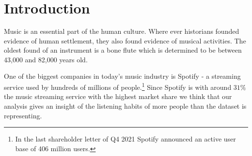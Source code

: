 \section{Introduction}
Music is an essential part of the human culture. Where ever historians founded evidence of human settlement, they also found evidence of musical activities. The oldest found of an instrument is a bone flute which is determined to be between 43,000 and 82,000 years old.\citep[p. 63]{Peretz2003} 

One of the biggest companies in today's music industry is Spotify - a streaming service used by hundreds of millions of people.\footnote{In the last shareholder letter of Q4 2021 Spotify announced an active user base of 406 million users.\citep{SpotifyTechnology2022}} Since Spotify is with around $31 \%$ the music streaming service with the highest market share \citep{Mulligan2022} we think that our analysis gives an insight of the listening habits of more people than the dataset is representing.